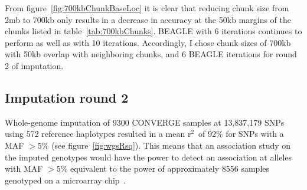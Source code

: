 \documentclass[a4paper]{article}
\newcommand{\rsq}{$\mbox{r}^2$~}
\begin{document}
\begin{comment}
\begin{figure}[htbp]
  \centering
  \texttt{[image: \{\{img/5683.4x/rsquares.tgp.converge.29440.700kb.binned\_by\_location.loc1]}}}
  \caption{Data from figure~\ref{fig:700kbChunks} plotted as a function
    of chromosomal position for the first chunk of size 700kb (see
    table~\ref{tab:700kbChunks}).}
  \label{fig:700kbChunk1}
\end{figure}

\begin{figure}[htbp]
  \centering
  \texttt{[image: \{\{img/5683.4x/rsquares.tgp.converge.29440.700kb.binned\_by\_location.loc2]}}}
  \caption{Data from figure~\ref{fig:700kbChunks} plotted as a function
    of chromosomal position for the second chunk of size 700kb (see
    table~\ref{tab:700kbChunks}).}
  \label{fig:700kbChunk2}
\end{figure}

\begin{figure}[htbp]
  \centering
  \texttt{[image: \{\{img/5683.4x/rsquares.tgp.converge.29440.700kb.binned\_by\_location.loc3]}}}
  \caption{Data from figure~\ref{fig:700kbChunks} plotted as a function
    of chromosomal position for the third chunk of size 700kb (see
    table~\ref{tab:700kbChunks}).}
  \label{fig:700kbChunk3}
\end{figure}
\end{comment}

From figure~\ref{fig:700kbChunkBaseLoc}
it is clear that reducing chunk size from
2mb to 700kb only results in a decrease in accuracy at the 50kb
margins of the chunks listed in table~\ref{tab:700kbChunks}. BEAGLE
with 6 iterations continues to perform as well as with 10 iterations.
Accordingly, I chose chunk sizes of 700kb with 50kb overlap with neighboring
chunks, and 6 BEAGLE iterations for round 2 of imputation.

\subsection*{Imputation round 2}

Whole-genome imputation of 9300 CONVERGE samples at 13,837,179 SNPs
using 572 reference haplotypes resulted in a mean \rsq of $92\%$ for
SNPs with a MAF $>5\%$ (see figure~\ref{fig:wgsRsq}).  This means that
an association study on the imputed genotypes would have the power to
detect an association at alleles with MAF $>5\%$ equivalent to the
power of approximately 8556 samples genotyped on a microarray
chip~\autocite{Pritchard2001}.
\end{document}
